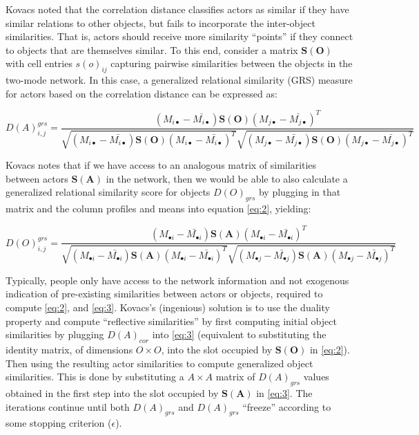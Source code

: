 \documentclass[a4paper,fleqn]{cas-sc}
\begin{document}
Kovacs noted that the correlation distance classifies actors as similar if they have similar relations to other objects, but fails to incorporate the inter-object similarities. That is, actors should receive more similarity ``points'' if they connect to objects that are themselves similar. To this end, consider a matrix $\mathbf{S(O)}$ with cell entries $s(o)_{ij}$ capturing pairwise similarities between the objects in the two-mode network. In this case, a generalized relational similarity (GRS) measure for actors based on the correlation distance can be expressed as:

\begin{equation}
    D(A)^{grs}_{i,j} = 
    \frac{
    (M_{i\bullet} - \bar{M_{i\bullet}})
    \mathbf{S(O)}
    (M_{j\bullet} - \bar{M_{j\bullet}})^T
    }
    {
    \sqrt{
    (M_{i\bullet} - \bar{M_{i\bullet}})
    \mathbf{S(O)}
    (M_{i\bullet} - \bar{M_{i\bullet}})^T
    }
    \sqrt{
    (M_{j\bullet} - \bar{M_{j\bullet}})
    \mathbf{S(O)}
    (M_{j\bullet} - \bar{M_{j\bullet}})^T
        }
    }
    \label{eq:2}
\end{equation}

Kovacs notes that if we have access to an analogous matrix of similarities between actors $\mathbf{S(A)}$ in the network, then we would be able to also calculate a generalized relational similarity score for objects $D(O)_{grs}$ by plugging in that matrix and the column profiles and means into equation \ref{eq:2}, yielding:

\begin{equation}
    D(O)^{grs}_{i,j} = 
    \frac{
    (M_{\bullet i} - \bar{M_{\bullet i}})
    \mathbf{S(A)}
    (M_{\bullet i} - \bar{M_{\bullet i}})^T
    }
    {
    \sqrt{
    (M_{\bullet i} - \bar{M_{\bullet i}})
    \mathbf{S(A)}
    (M_{\bullet i} - \bar{M_{\bullet i}})^T
    }
    \sqrt{
    (M_{\bullet j} - \bar{M_{\bullet j}})
    \mathbf{S(A)}
    (M_{\bullet j} - \bar{M_{\bullet j}})^T
        }
    }
    \label{eq:3}
\end{equation}

Typically, people only have access to the network information and not exogenous indication of pre-existing similarities between actors or objects, required to compute \ref{eq:2}, and \ref{eq:3}. Kovacs's (ingenious) solution is to use the duality property and compute ``reflective similarities'' by first computing initial object similarities by plugging $D(A)_{cor}$ into \ref{eq:3} (equivalent to substituting the identity matrix, of dimensions $O \times O$, into the slot occupied by $\mathbf{S(O)}$ in \ref{eq:2}). Then using the resulting actor similarities to compute generalized object similarities. This is done by substituting a $A \times A$ matrix of $D(A)_{grs}$ values obtained in the first step into the slot occupied by $\mathbf{S(A)}$ in \ref{eq:3}. The iterations continue until both $D(A)_{grs}$ and $D(A)_{grs}$ ``freeze'' according to some stopping criterion ($\epsilon$). 
\end{document}
